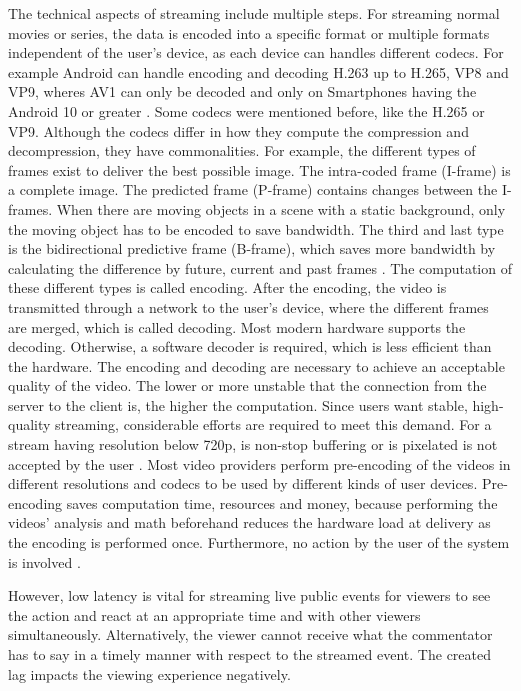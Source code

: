 The technical aspects of streaming include multiple steps. For streaming normal movies or series, the data is encoded into a specific format or multiple formats independent of the user’s device, as each device can handles different codecs. For example Android can handle encoding and decoding H.263 up to H.265, VP8 and VP9, wheres AV1 can only be decoded and only on Smartphones having the Android 10 or greater \parencite{Android2020}. Some codecs were mentioned before, like the H.265 or VP9. Although the codecs differ in how they compute the compression and decompression, they have commonalities. For example, the different types of frames exist to deliver the best possible image. The intra-coded frame (I-frame) is a complete image. The predicted frame (P-frame) contains changes between the I-frames. When there are moving objects in a scene with a static background, only the moving object has to be encoded to save bandwidth. The third and last type is the bidirectional predictive frame (B-frame), which saves more bandwidth by calculating the difference by future, current and past frames \parencite{Katto1995}. The computation of these different types is called encoding. After the encoding, the video is transmitted through a network to the user’s device, where the different frames are merged, which is called decoding. Most modern hardware supports the decoding. Otherwise, a software decoder is required, which is less efficient than the hardware. The encoding and decoding are necessary to achieve an acceptable quality of the video. The lower or more unstable that the connection from the server to the client is, the higher the computation. Since users want stable, high-quality streaming, considerable efforts are required to meet this demand. For a stream having resolution below 720p, is non-stop buffering or is pixelated is not accepted by the user \parencite{VideoAcceptance}. Most video providers perform pre-encoding of the videos in different resolutions and codecs to be used by different kinds of user devices. Pre-encoding saves computation time, resources and money, because performing the videos’ analysis and math beforehand reduces the hardware load at delivery as the encoding is performed once. Furthermore, no action by the user of the system is involved \parencite{Netflix2015}.
\par
However, low latency is vital for streaming live public events for viewers to see the action and react at an appropriate time and with other viewers simultaneously. Alternatively, the viewer cannot receive what the commentator has to say in a timely manner with respect to the streamed event. The created lag impacts the viewing experience negatively.
